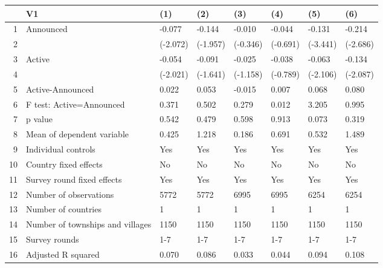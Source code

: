 \begin{table}[ht]
\centering
\begin{tabular}{rlllllll}
  \hline
 & V1 & (1) & (2) & (3) & (4) & (5) & (6) \\ 
  \hline
1 & Announced & -0.077 & -0.144 & -0.010 & -0.044 & -0.131 & -0.214 \\ 
  2 &  & (-2.072) & (-1.957) & (-0.346) & (-0.691) & (-3.441) & (-2.686) \\ 
  3 & Active & -0.054 & -0.091 & -0.025 & -0.038 & -0.063 & -0.134 \\ 
  4 &  & (-2.021) & (-1.641) & (-1.158) & (-0.789) & (-2.106) & (-2.087) \\ 
  5 & Active-Announced & 0.022 & 0.053 & -0.015 & 0.007 & 0.068 & 0.080 \\ 
  6 & F test: Active=Announced & 0.371 & 0.502 & 0.279 & 0.012 & 3.205 & 0.995 \\ 
  7 & p value & 0.542 & 0.479 & 0.598 & 0.913 & 0.073 & 0.319 \\ 
  8 & Mean of dependent variable & 0.425 & 1.218 & 0.186 & 0.691 & 0.532 & 1.489 \\ 
  9 & Individual controls & Yes & Yes & Yes & Yes & Yes & Yes \\ 
  10 & Country fixed effects & No & No & No & No & No & No \\ 
  11 & Survey round fixed effects & Yes & Yes & Yes & Yes & Yes & Yes \\ 
  12 & Number of observations & 5772 & 5772 & 6995 & 6995 & 6254 & 6254 \\ 
  13 & Number of countries & 1 & 1 & 1 & 1 & 1 & 1 \\ 
  14 & Number of townships and villages & 1150 & 1150 & 1150 & 1150 & 1150 & 1150 \\ 
  15 & Survey rounds & 1-7 & 1-7 & 1-7 & 1-7 & 1-7 & 1-7 \\ 
  16 & Adjusted R squared & 0.070 & 0.086 & 0.033 & 0.044 & 0.094 & 0.108 \\ 
   \hline
\end{tabular}
\end{table}
